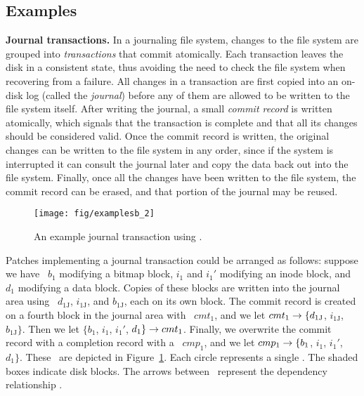 \subsection{Examples}
\label{sec:patch:examples}

\textbf{Journal transactions.}
%
In a journaling file system, changes to the file system are grouped into
\emph{transactions} that commit atomically.
%
Each transaction leaves the disk in a consistent state, thus avoiding the need
to check the file system when recovering from a failure.
%
All changes in a transaction are first copied into an on-disk log (called the
\emph{journal}) before any of them are allowed to be written to the file
system itself.
%
After writing the journal, a small \emph{commit record} is written atomically,
which signals that the transaction is complete and that all its changes should
be considered valid.
%
Once the commit record is written, the original changes can be written to the
file system in any order, since if the system is interrupted it can consult
the journal later and copy the data back out into the file system.
%
Finally, once all the changes have been written to the file system, the commit
record can be erased, and that portion of the journal may be reused.

\begin{figure}[htb]
  \centering
  \texttt{[image: fig/examplesb\_2]}
  \caption{\label{fig:journal} An example journal transaction using \patches.}
\end{figure}

Patches implementing a journal transaction could be arranged as follows:
%
suppose we have \patch\ $b_1$ modifying a bitmap block, $i_1$ and $i_1'$
modifying an inode block, and $d_1$ modifying a data block.
%
Copies of these blocks are written into the journal area using \patches\
$d_{1\textrm{J}}$, $i_{1\textrm{J}}$, and $b_{1\textrm{J}}$, each on its
own block.
%
The commit record is created on a fourth block in the journal area with
\patch\ $cmt_1$, and we let $cmt_1 \rightarrow \{d_{1\textrm{J}}$,
$i_{1\textrm{J}}$, $b_{1\textrm{J}}\}$.
%
Then we let $\{b_1$, $i_1$, $i_1'$, $d_1\} \rightarrow cmt_1$.
%
Finally, we overwrite the commit record with a completion record with a
\patch\ $cmp_1$, and we let $cmp_1 \rightarrow \{b_1$, $i_1$, $i_1'$,
$d_1\}$.
%
These \patches\ are depicted in Figure~\ref{fig:journal}.
%
Each circle represents a single \patch. The shaded boxes indicate disk blocks.
%
The arrows between \patches\ represent the dependency relationship \PDDepend.

